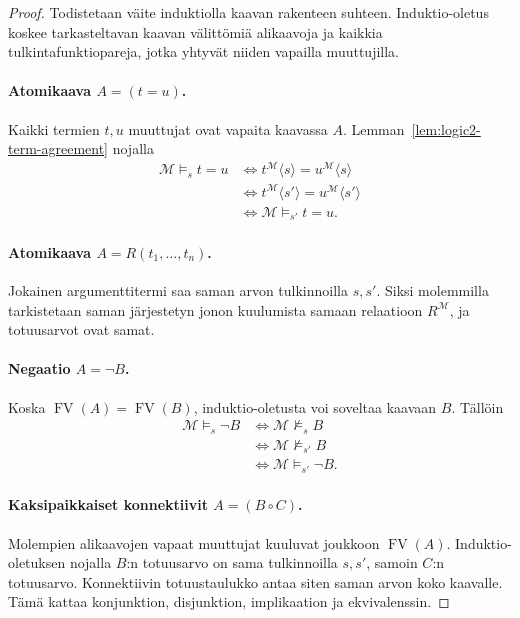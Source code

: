 \documentclass[11pt,a4paper]{amsart}
\begin{document}
\begin{proof}
  Todistetaan väite induktiolla kaavan rakenteen suhteen.
  Induktio-oletus koskee tarkasteltavan kaavan välittömiä alikaavoja
  ja kaikkia tulkintafunktiopareja, jotka yhtyvät niiden vapailla
  muuttujilla.

  \paragraph{Atomikaava $A=(t=u)$.}
  Kaikki termien $t,u$ muuttujat ovat vapaita kaavassa $A$.
  Lemman~\ref{lem:logic2-term-agreement} nojalla
  \begin{align*}
    \mathcal M\models_s t=u
    &\iff t^{\mathcal M}\langle s\rangle
    =u^{\mathcal M}\langle s\rangle\\
    &\iff t^{\mathcal M}\langle s'\rangle
    =u^{\mathcal M}\langle s'\rangle\\
    &\iff\mathcal M\models_{s'}t=u.
  \end{align*}

  \paragraph{Atomikaava $A=R(t_1,\ldots,t_n)$.}
  Jokainen argumenttitermi saa saman arvon tulkinnoilla $s,s'$.
  Siksi molemmilla tarkistetaan saman järjestetyn jonon kuulumista
  samaan relaatioon $R^{\mathcal M}$, ja totuusarvot ovat samat.

  \paragraph{Negaatio $A=\neg B$.}
  Koska $\operatorname{FV}(A)=\operatorname{FV}(B)$,
  induktio-oletusta voi soveltaa kaavaan $B$. Tällöin
  \begin{align*}
    \mathcal M\models_s\neg B
    &\iff\mathcal M\not\models_s B\\
    &\iff\mathcal M\not\models_{s'}B\\
    &\iff\mathcal M\models_{s'}\neg B.
  \end{align*}

  \paragraph{Kaksipaikkaiset konnektiivit $A=(B\mathbin{\circ}C)$.}
  Molempien alikaavojen vapaat muuttujat kuuluvat joukkoon
  $\operatorname{FV}(A)$. Induktio-oletuksen nojalla $B$:n
  totuusarvo on sama tulkinnoilla $s,s'$, samoin $C$:n totuusarvo.
  Konnektiivin totuustaulukko antaa siten saman arvon koko kaavalle.
  Tämä kattaa konjunktion, disjunktion, implikaation ja ekvivalenssin.


\end{proof}
\end{document}
